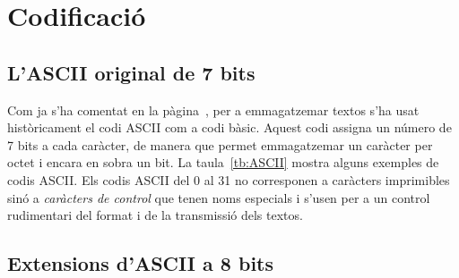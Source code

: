 \section{Codificació}

\subsection{L'ASCII original de 7 bits}

Com ja s'ha comentat en la pàgina~\pageref{pg:ASCII}, per a
emmagatzemar textos s'ha usat històricament el codi ASCII com a codi
bàsic. Aquest codi assigna un número de 7 bits a cada caràcter, de
manera que permet emmagatzemar un caràcter per octet i encara en sobra
un bit. La taula~\ref{tb:ASCII} mostra alguns exemples de codis
ASCII. Els codis ASCII del 0 al 31 no corresponen a caràcters
imprimibles sinó a \emph{caràcters de control} que tenen noms
especials i s'usen per a un control rudimentari del format i de la
transmissió dels textos.

\subsection{Extensions d'ASCII a 8 bits}
\label{s3:ISO}

